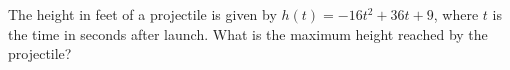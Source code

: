The height in feet of a projectile is given by \(h(t)=-16t^2+36t+9\), where \(t\) is the time in seconds after launch. What is the maximum height reached by the projectile?
